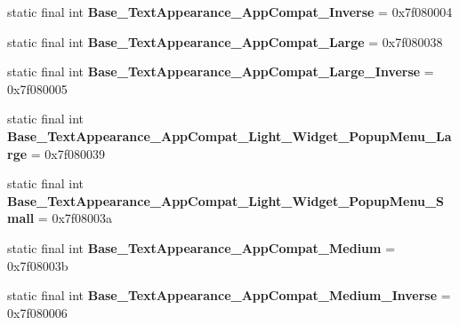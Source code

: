 \begin{DoxyCompactItemize}
\item 
\hypertarget{classandroid_1_1support_1_1design_1_1_r_1_1style_a8f575fb7354eb689d4fa5a254cec65bf}{}static final int {\bfseries Base\+\_\+\+Text\+Appearance\+\_\+\+App\+Compat\+\_\+\+Inverse} = 0x7f080004\label{classandroid_1_1support_1_1design_1_1_r_1_1style_a8f575fb7354eb689d4fa5a254cec65bf}

\item 
\hypertarget{classandroid_1_1support_1_1design_1_1_r_1_1style_a92a330241ceb1bd4b3d508a9024f69ce}{}static final int {\bfseries Base\+\_\+\+Text\+Appearance\+\_\+\+App\+Compat\+\_\+\+Large} = 0x7f080038\label{classandroid_1_1support_1_1design_1_1_r_1_1style_a92a330241ceb1bd4b3d508a9024f69ce}

\item 
\hypertarget{classandroid_1_1support_1_1design_1_1_r_1_1style_a3af9338b78523cbd0bf2bb8c522aa6e8}{}static final int {\bfseries Base\+\_\+\+Text\+Appearance\+\_\+\+App\+Compat\+\_\+\+Large\+\_\+\+Inverse} = 0x7f080005\label{classandroid_1_1support_1_1design_1_1_r_1_1style_a3af9338b78523cbd0bf2bb8c522aa6e8}

\item 
\hypertarget{classandroid_1_1support_1_1design_1_1_r_1_1style_a5541db6161143bcd88a34c99173206b0}{}static final int {\bfseries Base\+\_\+\+Text\+Appearance\+\_\+\+App\+Compat\+\_\+\+Light\+\_\+\+Widget\+\_\+\+Popup\+Menu\+\_\+\+Large} = 0x7f080039\label{classandroid_1_1support_1_1design_1_1_r_1_1style_a5541db6161143bcd88a34c99173206b0}

\item 
\hypertarget{classandroid_1_1support_1_1design_1_1_r_1_1style_a7030c0ee4caa8ad4f83264595a9665ac}{}static final int {\bfseries Base\+\_\+\+Text\+Appearance\+\_\+\+App\+Compat\+\_\+\+Light\+\_\+\+Widget\+\_\+\+Popup\+Menu\+\_\+\+Small} = 0x7f08003a\label{classandroid_1_1support_1_1design_1_1_r_1_1style_a7030c0ee4caa8ad4f83264595a9665ac}

\item 
\hypertarget{classandroid_1_1support_1_1design_1_1_r_1_1style_a84633763d93f6cad04ea614f8458d723}{}static final int {\bfseries Base\+\_\+\+Text\+Appearance\+\_\+\+App\+Compat\+\_\+\+Medium} = 0x7f08003b\label{classandroid_1_1support_1_1design_1_1_r_1_1style_a84633763d93f6cad04ea614f8458d723}

\item 
\hypertarget{classandroid_1_1support_1_1design_1_1_r_1_1style_a5b24f05ad226eb4d1d3eb501c1149688}{}static final int {\bfseries Base\+\_\+\+Text\+Appearance\+\_\+\+App\+Compat\+\_\+\+Medium\+\_\+\+Inverse} = 0x7f080006\label{classandroid_1_1support_1_1design_1_1_r_1_1style_a5b24f05ad226eb4d1d3eb501c1149688}


\end{DoxyCompactItemize}
